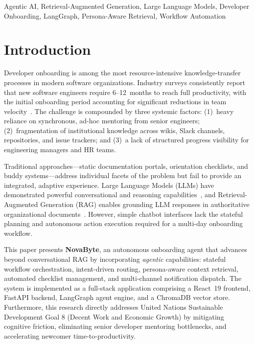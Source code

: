 \documentclass[conference]{IEEEtran}
\begin{document}
\begin{IEEEkeywords}
Agentic AI, Retrieval-Augmented Generation, Large Language Models, Developer Onboarding, LangGraph, Persona-Aware Retrieval, Workflow Automation
\end{IEEEkeywords}

\section{Introduction}

Developer onboarding is among the most resource-intensive knowledge-transfer processes in modern software organizations. Industry surveys consistently report that new software engineers require 6--12~months to reach full productivity, with the initial onboarding period accounting for significant reductions in team velocity~\cite{hossain2024perfect}. The challenge is compounded by three systemic factors: (1)~heavy reliance on synchronous, ad-hoc mentoring from senior engineers; (2)~fragmentation of institutional knowledge across wikis, Slack channels, repositories, and issue trackers; and (3)~a lack of structured progress visibility for engineering managers and HR teams.

Traditional approaches---static documentation portals, orientation checklists, and buddy systems---address individual facets of the problem but fail to provide an integrated, adaptive experience. Large Language Models (LLMs) have demonstrated powerful conversational and reasoning capabilities~\cite{brown2020language}, and Retrieval-Augmented Generation (RAG) enables grounding LLM responses in authoritative organizational documents~\cite{lewis2020rag}. However, simple chatbot interfaces lack the stateful planning and autonomous action execution required for a multi-day onboarding workflow.

This paper presents \textbf{NovaByte}, an autonomous onboarding agent that advances beyond conversational RAG by incorporating \emph{agentic} capabilities: stateful workflow orchestration, intent-driven routing, persona-aware context retrieval, automated checklist management, and multi-channel notification dispatch. The system is implemented as a full-stack application comprising a React~19 frontend, FastAPI backend, LangGraph agent engine, and a ChromaDB vector store. Furthermore, this research directly addresses United Nations Sustainable Development Goal 8 (Decent Work and Economic Growth) by mitigating cognitive friction, eliminating senior developer mentoring bottlenecks, and accelerating newcomer time-to-productivity.
\end{document}
